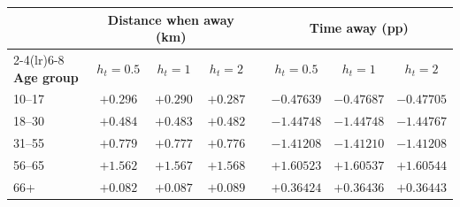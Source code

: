 \begin{tabular}{lccccccc}
\toprule
 & \multicolumn{3}{c}{\textbf{Distance when away (km)}} & & \multicolumn{3}{c}{\textbf{Time away (pp)}} \\
\cmidrule(lr){2-4}\cmidrule(lr){6-8}
\textbf{Age group} & $h_t=0.5$ & $h_t=1$ & $h_t=2$ & & $h_t=0.5$ & $h_t=1$ & $h_t=2$ \\
\midrule
10--17 & $+0.296$ & $+0.290$ & $+0.287$ & & $-0.47639$ & $-0.47687$ & $-0.47705$ \\
18--30 & $+0.484$ & $+0.483$ & $+0.482$ & & $-1.44748$ & $-1.44748$ & $-1.44767$ \\
31--55 & $+0.779$ & $+0.777$ & $+0.776$ & & $-1.41208$ & $-1.41210$ & $-1.41208$ \\
56--65 & $+1.562$ & $+1.567$ & $+1.568$ & & $+1.60523$ & $+1.60537$ & $+1.60544$ \\
66+ & $+0.082$ & $+0.087$ & $+0.089$ & & $+0.36424$ & $+0.36436$ & $+0.36443$ \\
\bottomrule
\end{tabular}
